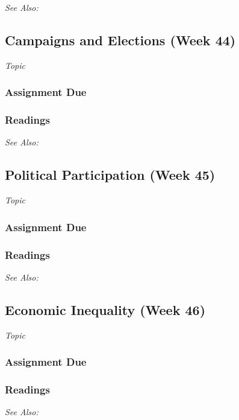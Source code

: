 \documentclass[12pt,a4paper]{article}
\newcommand{\seealso}{\noindent \emph{See Also:}\\}
\begin{document}
\seealso



\clearpage
\subsection{Campaigns and Elections (Week 44)}
\emph{Topic}
\vspace{1em}
\subsubsection*{Assignment Due}

\subsubsection*{Readings}

\seealso




\clearpage
\subsection{Political Participation (Week 45)}
\emph{Topic}
\vspace{1em}
\subsubsection*{Assignment Due}

\subsubsection*{Readings}


\seealso




\clearpage
\subsection{Economic Inequality (Week 46)}
\emph{Topic}
\vspace{1em}
\subsubsection*{Assignment Due}

\subsubsection*{Readings}

\seealso



\clearpage
\end{document}
